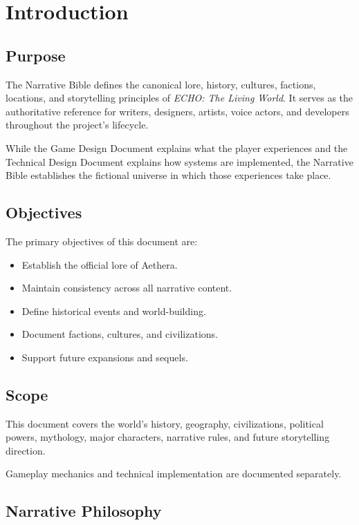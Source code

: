 \chapter{Introduction}

\section{Purpose}

The Narrative Bible defines the canonical lore, history, cultures, factions, locations, and storytelling principles of \textit{ECHO: The Living World}. It serves as the authoritative reference for writers, designers, artists, voice actors, and developers throughout the project's lifecycle.

While the Game Design Document explains what the player experiences and the Technical Design Document explains how systems are implemented, the Narrative Bible establishes the fictional universe in which those experiences take place.

\section{Objectives}

The primary objectives of this document are:

\begin{itemize}
    \item Establish the official lore of Aethera.
    \item Maintain consistency across all narrative content.
    \item Define historical events and world-building.
    \item Document factions, cultures, and civilizations.
    \item Support future expansions and sequels.
\end{itemize}

\section{Scope}

This document covers the world's history, geography, civilizations, political powers, mythology, major characters, narrative rules, and future storytelling direction.

Gameplay mechanics and technical implementation are documented separately.

\section{Narrative Philosophy}

